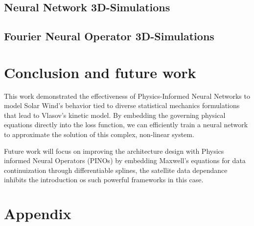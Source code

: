 \documentclass[12pt]{article}
\begin{document}
\subsection{Neural Network 3D-Simulations}

\subsection{Fourier Neural Operator 3D-Simulations}

\section{Conclusion and future work}
This work demonstrated the effectiveness of Physics-Informed Neural Networks to model Solar Wind's behavior tied to diverse statistical mechanics formulations that lead to Vlasov's kinetic model. By embedding the governing physical equations directly into the loss function, we can efficiently train a neural network to approximate the solution of this complex, non-linear system.

Future work will focus on improving the architecture design with Physics informed Neural Operators (PINOs) \cite{li2023physicsinformedneuraloperatorlearning} by embedding Maxwell's equations for data continuization through differentiable splines, the satellite data dependance inhibits the introduction os such powerful frameworks in this case.

\section{Appendix}




\end{document}
